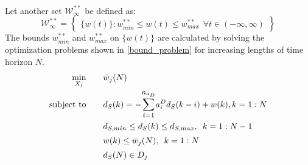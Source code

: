 \documentclass[letterpaper, 10 pt, conference]{ieeeconf}  %
\newcommand{\notimplies}{%
	\mathrel{{\ooalign{\hidewidth$\not\phantom{=}$\hidewidth\cr$\implies$}}}}
\begin{document}
	\\
	Let another set $\mathcal{W}^{**}_{\infty}$ be defined as:
		\begin{equation*}
		\hspace{0pt}
		\mathcal{W}^{**}_{\infty} = \begin{Bmatrix} \{w(t)\}: 
		w^{**}_{min}\leq w(t)\leq w^{**}_{max} \hspace{5pt}
		\forall t \in (-\infty,\infty) 
		\end{Bmatrix}
		\end{equation*}  
	 The bounds $w^{**}_{min}$ and $w^{**}_{max}$ on $\{w(t)\}$ are calculated by solving the optimization problems shown in \eqref{bound_problem} for increasing lengths of time horizon $N$.
	\begin{equation}
	\small
	\label{bound_problem}
	\begin{matrix}
	\begin{aligned}
	\underset{X_{j}}{\text{min}}
	 & \hspace{20pt} \bar{w}_j(N)  \\
	\text{subject to} 
	 & \hspace{20pt}
	d_S(k) = -\mathlarger{\sum\limits_{i=1}^{n_{a_D}}}a_i^Dd_S(k-i) + w(k), k={1:N}\\
	 & \hspace{20pt}  d_{S,min} \leq d_S(k) \leq d_{S,max}, \hspace{5pt} k={1:N-1} \vspace{0pt}\\
	 & \hspace{20pt}   w(k) \leq \bar{w}_j(N), \hspace{5pt} k={1:N} \vspace{0pt}\\
	 & \hspace{20pt}  d_S(N) \in D_j 
	 \end{aligned}
	\vspace{10pt} 
	\end{matrix}
	\end{equation}
\end{document}
